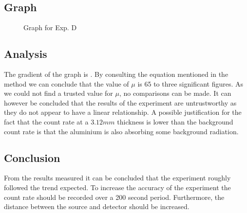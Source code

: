 \subsection{Graph}

\begin{figure}[H]
  \centering
  \caption{Graph for Exp. D}
\end{figure}

\subsection{Analysis}
The gradient of the graph is \regaD. By consulting the equation mentioned in the method we can conclude that the value of $\mu$ is 65 to three significant figures. As we could not find a trusted value for $\mu$, no comparisons can be made. It can however be concluded that the results of the experiment are untrustworthy as they do not appear to have a linear relationship. A possible justification for the fact that the count rate at a $3.12mm$ thickness is lower than the background count rate is that the aluminium is also absorbing some background radiation.

\subsection{Conclusion}
From the results measured it can be concluded that the experiment roughly followed the trend expected.
To increase the accuracy of the experiment the count rate should be recorded over a 200 second period.
Furthermore, the distance between the source and detector should be increased.
